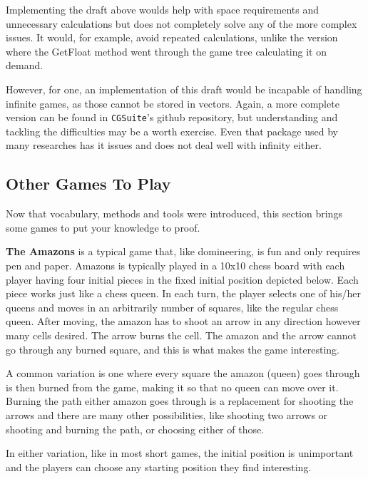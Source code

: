

Implementing the draft above woulds help with space requirements and unnecessary calculations but does not completely solve any of the more complex issues. It would, for example, avoid repeated calculations, unlike the version where the GetFloat method went through the game tree calculating it on demand.

However, for one, an implementation of this draft would be incapable of handling infinite games, as those cannot be stored in vectors. Again, a more complete version can be found in \texttt{CGSuite}'s github repository, but understanding and tackling the difficulties may be a worth exercise. Even that package used by many researches has it issues and does not deal well with infinity either.

\subsection*{Other Games To Play}

Now that vocabulary, methods and tools were introduced, this section brings some games to put your knowledge to proof.

\textbf{The Amazons} is a typical game that, like domineering, is fun and only requires pen and paper. Amazons is typically played in a 10x10 chess board with each player having four initial pieces in the fixed initial position depicted below. Each piece works just like a chess queen. In each turn, the player selects one of his/her queens and moves in an arbitrarily number of squares, like the regular chess queen. After moving, the amazon has to shoot an arrow in any direction however many cells desired. The arrow burns the cell. The amazon and the arrow cannot go through any burned square, and this is what makes the game interesting.

A common variation is one where every square the amazon (queen) goes through is then burned from the game, making it so that no queen can move over it. Burning the path either amazon goes through is a replacement for shooting the arrows and there are many other possibilities, like shooting two arrows or shooting and burning the path, or choosing either of those.

In either variation, like in most short games, the initial position is unimportant and the players can choose any starting position they find interesting.

